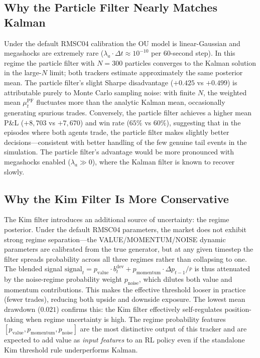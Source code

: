 \documentclass[11pt]{article}
\begin{document}
\subsection{Why the Particle Filter Nearly Matches Kalman}

Under the default RMSC04 calibration the OU model is linear-Gaussian and
megashocks are extremely rare ($\lambda_a \cdot \Delta t \approx 10^{-10}$
per 60-second step).
In this regime the particle filter with $N=300$ particles converges
to the Kalman solution in the large-$N$ limit; both trackers estimate
approximately the same posterior mean.
The particle filter's slight Sharpe disadvantage ($+0.425$ vs $+0.499$) is
attributable purely to Monte Carlo sampling noise: with finite $N$, the
weighted mean $\mu_t^{\text{PF}}$ fluctuates more than the analytic Kalman
mean, occasionally generating spurious trades.
Conversely, the particle filter achieves a higher mean P\&L ($+8{,}703$
vs $+7{,}670$\textcent) and win rate ($65\%$ vs $60\%$), suggesting that
in the episodes where both agents trade, the particle filter makes slightly
better decisions---consistent with better handling of the few genuine
tail events in the simulation.
The particle filter's advantage would be more pronounced with megashocks
enabled ($\lambda_a \gg 0$), where the Kalman filter is known to recover
slowly.

\subsection{Why the Kim Filter Is More Conservative}

The Kim filter introduces an additional source of uncertainty: the regime
posterior.
Under the default RMSC04 parameters, the market does not exhibit strong
regime separation---the VALUE/MOMENTUM/NOISE dynamic parameters are calibrated
from the true generator, but at any given timestep the filter spreads
probability across all three regimes rather than collapsing to one.
The blended signal
$\text{signal}_t = p_{\text{value}} \cdot b_t^{\text{dev}}
+ p_{\text{momentum}} \cdot \Delta p_{t-1}/\bar{r}$
is thus attenuated by the noise-regime probability weight $p_{\text{noise}}$,
which dilutes both value and momentum contributions.
This makes the effective threshold looser in practice (fewer trades),
reducing both upside and downside exposure.
The lowest mean drawdown ($0.021$) confirms this: the Kim filter effectively
self-regulates position-taking when regime uncertainty is high.
The regime probability features $[p_{\text{value}}, p_{\text{momentum}},
p_{\text{noise}}]$ are the most distinctive output of this tracker and are
expected to add value as \emph{input features} to an RL policy even if the
standalone Kim threshold rule underperforms Kalman.
\end{document}
